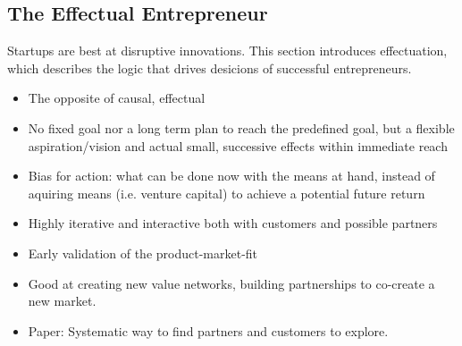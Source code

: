 \documentclass[a4paper,10pt]{article}
\begin{document}
\subsection{The Effectual Entrepreneur}
Startups are best at disruptive innovations. This section introduces effectuation, which describes the logic that drives desicions of successful entrepreneurs.
\begin{itemize}
  \item The opposite of causal, effectual
  \item No fixed goal nor a long term plan to reach the predefined goal, but a flexible aspiration/vision and actual small, successive effects within immediate reach
  \item Bias for action: what can be done now with the means at hand, instead of aquiring means (i.e. venture capital) to achieve a potential future return
  \item Highly iterative and interactive both with customers and possible partners
  \item Early validation of the product-market-fit
  \item Good at creating new value networks, building partnerships to co-create a new market. 
  \item Paper: Systematic way to find partners and customers to explore.
\end{itemize}
\end{document}

